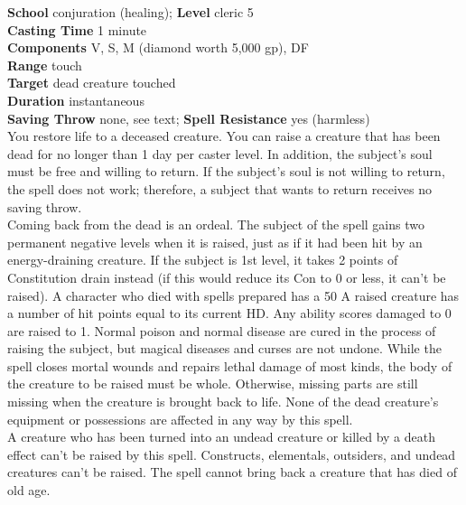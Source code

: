\textbf{School }conjuration (healing); \textbf{Level }cleric 5\\
\textbf{Casting Time }1 minute\\
\textbf{Components }V, S, M (diamond worth 5,000 gp), DF\\
\textbf{Range }touch\\
\textbf{Target }dead creature touched\\
\textbf{Duration }instantaneous\\
\textbf{Saving Throw }none, see text; \textbf{Spell Resistance }yes (harmless)\\
You restore life to a deceased creature. You can raise a creature that has been dead for no longer than 1 day per caster level. In addition, the subject's soul must be free and willing to return. If the subject's soul is not willing to return, the spell does not work; therefore, a subject that wants to return receives no saving throw.\\
Coming back from the dead is an ordeal. The subject of the spell gains two permanent negative levels when it is raised, just as if it had been hit by an energy-draining creature. If the subject is 1st level, it takes 2 points of Constitution drain instead (if this would reduce its Con to 0 or less, it can't be raised). A character who died with spells prepared has a 50%
A raised creature has a number of hit points equal to its current HD. Any ability scores damaged to 0 are raised to 1. Normal poison and normal disease are cured in the process of raising the subject, but magical diseases and curses are not undone. While the spell closes mortal wounds and repairs lethal damage of most kinds, the body of the creature to be raised must be whole. Otherwise, missing parts are still missing when the creature is brought back to life. None of the dead creature's equipment or possessions are affected in any way by this spell.\\
A creature who has been turned into an undead creature or killed by a death effect can't be raised by this spell. Constructs, elementals, outsiders, and undead creatures can't be raised. The spell cannot bring back a creature that has died of old age.\\
